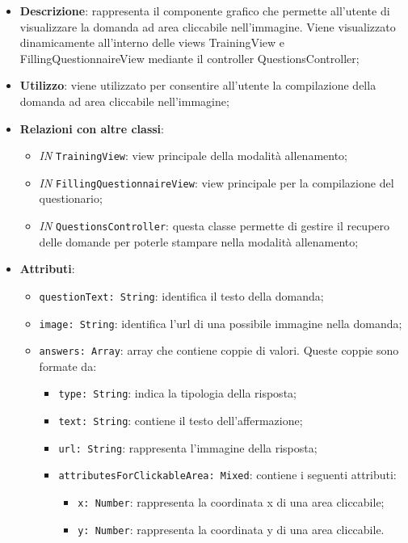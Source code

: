 		\begin{itemize}
			\item \textbf{Descrizione}: rappresenta il componente grafico che permette all'utente di visualizzare la domanda ad area cliccabile nell'immagine. Viene visualizzato dinamicamente all'interno delle views TrainingView e FillingQuestionnaireView mediante il controller QuestionsController;
			\item \textbf{Utilizzo}: viene utilizzato per consentire all'utente la compilazione della domanda ad area cliccabile nell'immagine;
			\item \textbf{Relazioni con altre classi}: 
			\begin{itemize}
				\item \textit{IN} \texttt{TrainingView}: view principale della modalità allenamento; 
				\item \textit{IN} \texttt{FillingQuestionnaireView}: view principale per la compilazione del questionario;
				\item \textit{IN} \texttt{QuestionsController}: questa classe permette di gestire il recupero delle domande per poterle stampare nella modalità allenamento;
				
			\end{itemize}
			\item \textbf{Attributi}: 
				\begin{itemize}
					\item \texttt{questionText: String}: identifica il testo della domanda;
					\item \texttt{image: String}: identifica l'url di una possibile immagine nella domanda;
					\item \texttt{answers: Array}: array che contiene coppie di valori. Queste coppie sono formate da:
					\begin{itemize}
						\item \texttt{type: String}: indica la tipologia della risposta;
						\item \texttt{text: String}: contiene il testo dell'affermazione;
						\item \texttt{url: String}: rappresenta l'immagine della risposta;
						\item \texttt{attributesForClickableArea: Mixed}: contiene i seguenti attributi:
						\begin{itemize}
							\item \texttt{x: Number}: rappresenta la coordinata x di una area cliccabile;
							\item \texttt{y: Number}: rappresenta la coordinata y di una area cliccabile.
						\end{itemize}
					\end{itemize}
				\end{itemize}
		\end{itemize}
	
